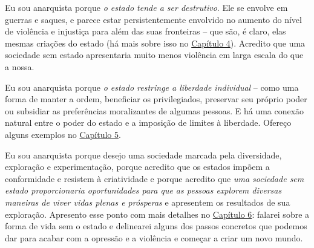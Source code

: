 Eu sou anarquista porque \emph{o estado tende a ser destrutivo}. Ele se envolve em guerras e saques, e parece estar persistentemente envolvido no aumento do nível de violência e injustiça para além das suas fronteiras -- que são, é claro, elas mesmas criações do estado (há mais sobre isso no \hyperref[chap:4]{Capítulo 4}). Acredito que uma sociedade sem estado apresentaria muito menos violência em larga escala do que a nossa.

Eu sou anarquista porque \emph{o estado restringe a liberdade individual} -- como uma forma de manter a ordem, beneficiar os privilegiados, preservar seu próprio poder ou subsidiar as preferências moralizantes de algumas pessoas. E há uma conexão natural entre o poder do estado e a imposição de limites à liberdade. Ofereço alguns exemplos no \hyperref[chap:5]{Capítulo 5}.

Eu sou anarquista porque desejo uma sociedade marcada pela diversidade, exploração e experimentação, porque acredito que os estados impõem a conformidade e resistem à criatividade e porque acredito que \emph{uma sociedade sem estado proporcionaria oportunidades para que as pessoas explorem diversas maneiras de viver vidas plenas e prósperas} e apresentem os resultados de sua exploração. Apresento esse ponto com mais detalhes no \hyperref[chap:6]{Capítulo 6}: falarei sobre a forma de vida sem o estado e delinearei alguns dos passos concretos que podemos dar para acabar com a opressão e a violência e começar a criar um novo mundo.